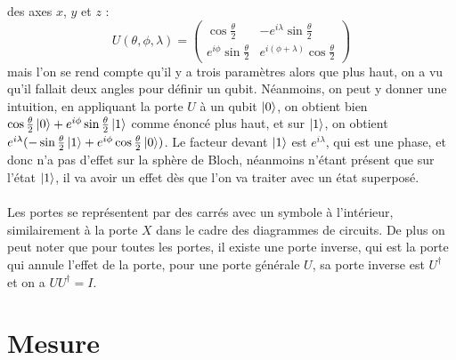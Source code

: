 des axes $x$, $y$ et $z$ :
\[
    U(\theta, \phi, \lambda) = \begin{pmatrix} \cos \frac{\theta}{2} & -e^{i \lambda} \sin \frac{\theta}{2} \\ e^{i \phi} \sin \frac{\theta}{2} & e^{i (\phi + \lambda)} \cos \frac{\theta}{2} \end{pmatrix}
\]
mais l'on se rend compte qu'il y a trois paramètres alors que plus haut, on a vu qu'il fallait deux angles pour
définir un qubit.
Néanmoins, on peut y donner une intuition, en appliquant la porte $U$ à un qubit $\ket{0}$, on obtient bien
$\cos \frac{\theta}{2} \ket{0} + e^{i \phi} \sin \frac{\theta}{2} \ket{1}$ comme énoncé plus haut, et sur $\ket{1}$,
on obtient $e^{i \lambda}(-\sin \frac{\theta}{2} \ket{1} + e^{i \phi} \cos \frac{\theta}{2} \ket{0})$.
Le facteur devant $\ket{1}$ est $e^{i \lambda}$, qui est une phase, et donc n'a pas d'effet sur la sphère de Bloch,
néanmoins n'étant présent que sur l'état $\ket{1}$, il va avoir un effet dès que l'on va traiter avec un état
superposé.\\ \\
Les portes se représentent par des carrés avec un symbole à l'intérieur, similairement à la porte $X$ dans le
cadre des diagrammes de circuits.
De plus on peut noter que pour toutes les portes, il existe une porte inverse, qui est la porte qui annule l'effet
de la porte, pour une porte générale $U$, sa porte inverse est $U^\dagger$ et on a $U U^\dagger = I$.

\section{Mesure}\label{sec:mesure}

